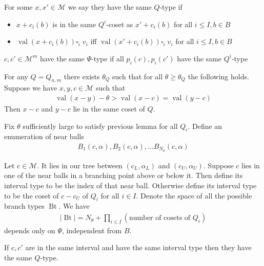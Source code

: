 \documentclass{amsart}
\newcommand{\M}{\mathcal M}
\newcommand{\paren}[1]{\left(#1\right)}
\DeclareMathOperator{\Bt}{Bt}
\DeclareMathOperator{\val}{val}
\begin{document}
For some $x, x' \in \M$ we say they have the same $Q$-type if
\begin{itemize}
	\item $x + c_i(b)$ is in the same $Q^i$-coset as $x' + c_i(b)$ for all $i \leq I, b \in B$
	\item $\val(x + c_i(b)) \square_i \; v_i$ iff $\val(x' + c_i(b)) \square_i \; v_i$ for all $i \leq I, b \in B$
\end{itemize}
 
\begin{Lemma}
	$c, c' \in \M^m$ have the same $\Psi$-type if all $p_i(c), p_i(c')$ have the same $Q^i$-type
\end{Lemma}

\begin{Lemma}
	For any $Q = Q_{n,m}$ there exists $\theta_Q$ such that for all $\theta \geq \theta_Q$ the following holds.
	Suppose we have $x,y,c \in \M$ such that
	\begin{align*}
		\val(x-y) - \theta > \val(x-c) = \val(y-c)
	\end{align*}
	Then $x-c$ and $y-c$ lie in the same coset of $Q$.
\end{Lemma}

\begin{Lemma}
	Fix $\theta$ sufficiently large to satisfy previous lemma for all $Q_i$. Define an enumeration of near balls
	\begin{align*}
		B_1(c, \alpha), B_2(c, \alpha), \ldots B_{N_\theta}(c, \alpha)
	\end{align*}
\end{Lemma}

\begin{Definition}
	Let $c \in \M$.
	It lies in our tree between $(c_L, \alpha_L)$ and $(c_U, \alpha_U)$.
	Suppose $c$ lies in one of the near balls in a branching point above or below it.
	Then define its interval type to be the index of that near ball.
	Otherwise define its interval type to be the coset of $c - c_U$ of $Q_i$ for all $i \in I$.
	Denote the space of all the possible branch types $\Bt$.
	We have
	\begin{align*}
		|\Bt| = N_\theta + \prod_{i \leq I} \paren{\text {number of cosets of $Q_i$}}
	\end{align*}
	depends only on $\Psi$, independent from $B$.
	
\end{Definition}

\begin{Lemma}
	If $c, c'$ are in the same interval and have the same interval type then they have the same $Q$-type.
\end{Lemma}
\end{document}
